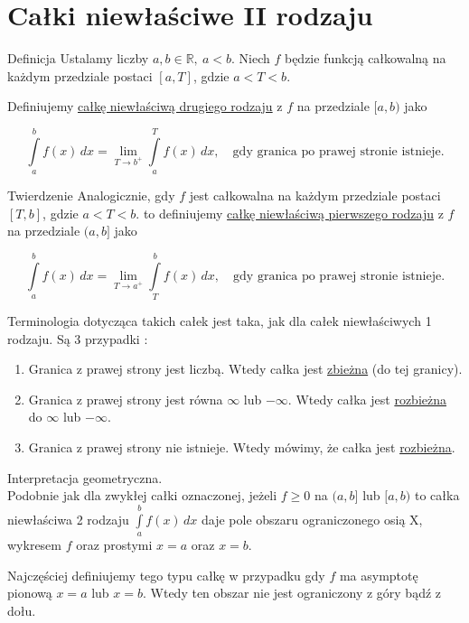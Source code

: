 \chapter{Całki niewłaściwe II rodzaju}

\begin{tw}{Definicja}
Ustalamy liczby $ a,b \in \mathbb{R}, \ a < b $. Niech $f$ będzie funkcją całkowalną na każdym przedziale postaci $[a, T] $,
gdzie $ a < T < b $. 

Definiujemy \underline{całkę niewłaściwą drugiego rodzaju} z $f$ na przedziale $[a, b)$ jako

\[ \int\limits_{a}^{b} f(x) \,dx = \lim_{T \to b^+} \int\limits_{a}^{T} f(x) \,dx, \quad \textrm{gdy granica po prawej stronie istnieje.}\]
\end{tw}

\begin{tw}{Twierdzenie}
Analogicznie, gdy $f$ jest całkowalna na każdym przedziale postaci $[T,b]$, gdzie $ a < T < b $. to definiujemy
\underline{całkę niewłaściwą pierwszego rodzaju} z $f$ na przedziale $(a, b]$ jako

\[ \int\limits_{a}^{b} f(x) \,dx = \lim_{T \to a^+} \int\limits_{T}^{b} f(x) \,dx, \quad \textrm{gdy granica po prawej stronie istnieje.}\]
\end{tw}

Terminologia dotycząca takich całek jest taka, jak dla całek niewłaściwych 1 rodzaju. Są 3 przypadki : 

\begin{enumerate}
    \item Granica z prawej strony jest liczbą. Wtedy całka jest \underline{zbieżna} (do tej granicy).
    \item Granica z prawej strony jest równa $\infty$ lub $-\infty$. Wtedy całka jest \underline{rozbieżna} do $\infty$ lub $-\infty$.
    \item Granica z prawej strony nie istnieje. Wtedy mówimy, że całka jest \underline{rozbieżna}. \\
\end{enumerate}

Interpretacja geometryczna. \\

Podobnie jak dla zwykłej całki oznaczonej, jeżeli $f \geq 0$ na $(a,b]$ lub $[a,b)$ to całka niewłaściwa 2 rodzaju
$ \int\limits_{a}^{b} f(x) \,dx $ daje pole obszaru ograniczonego osią X, wykresem $f$ oraz prostymi $x=a$ oraz $x=b$.

Najczęściej definiujemy tego typu całkę w przypadku gdy $f$ ma asymptotę pionową $x=a$ lub $x=b$. Wtedy ten obszar
nie jest ograniczony z góry bądź z dołu. \\

